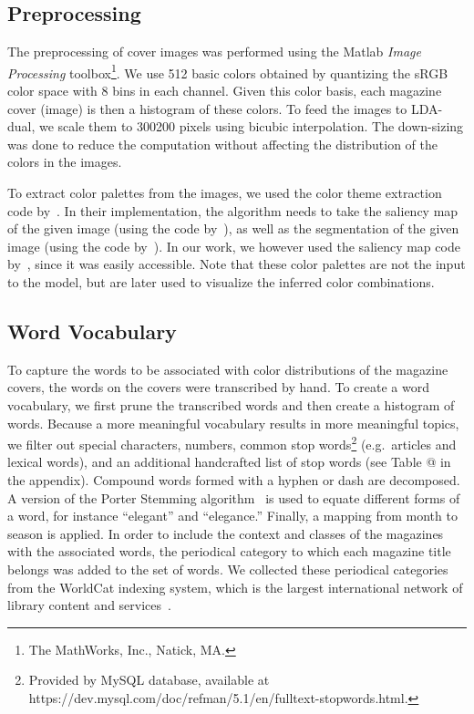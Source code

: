 \documentclass[prodmode,acmtochi]{acmsmall}
\makeatletter
\newcommand{\Rmnum}[1]{\expandafter\@slowromancap\romannumeral #1@}
\makeatother
\begin{document}
\subsection{Preprocessing}
\label{sec:Preprocessing}

The preprocessing of cover images was performed using the Matlab \emph{Image Processing} toolbox\footnote{The MathWorks, Inc., Natick, MA.}.
We use 512 basic colors obtained by quantizing the sRGB color space with 8 bins in
each channel. Given this color basis, each magazine cover (image) is then a
histogram of these colors.  To feed the images to LDA-dual, we scale them
to 300200 pixels using bicubic interpolation.
The down-sizing was done to reduce the computation without affecting the distribution of the colors in the images.


To extract color palettes from the images, we used the color theme extraction code by~\cite{2013-color-themes}. In their implementation, the algorithm needs to take the saliency map of the given image (using the code by~\cite{judd2009learning}), as well as the segmentation of the given image (using the code by~\cite{felzenszwalb2004efficient}). In our work, we however used the saliency map code by~\cite{harel2007graph}, since it was easily accessible. Note
that these color palettes are not the input to the model, but are later used to visualize the inferred
color combinations.


\subsection{Word Vocabulary}

To capture the words to be associated with color distributions of the magazine
covers, the words on the covers were transcribed by hand. To create a
word vocabulary, we first prune the transcribed words and then create a
histogram of words. Because a more meaningful vocabulary results in more
meaningful topics, we filter out special characters, numbers, common stop
words\footnote{Provided by MySQL database, available at https://dev.mysql.com/doc/refman/5.1/en/fulltext-stopwords.html.} (e.g.\ articles and lexical words), and an additional handcrafted list of stop words (see Table \Rmnum{2} in the appendix).
Compound words formed with a hyphen or dash are
decomposed.  A version of the Porter Stemming
algorithm~\cite{porter1980algorithm} is used to equate different forms
of a word, for instance ``elegant'' and ``elegance.'' Finally, a mapping
from month to season is applied.  In order to include the context and
classes of the magazines with the associated words, the periodical category to which
each magazine title belongs was added to the set of words. We
collected these periodical categories from the WorldCat indexing system,
which is the largest international network of library content and
services~\cite{worldcat}.
\end{document}
